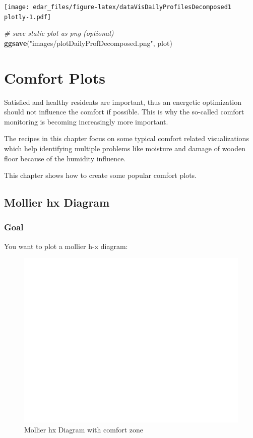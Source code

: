 \documentclass[
  a4paperpaper,
]{book}
\newenvironment{Shaded}{\begin{snugshade}}{\end{snugshade}}
\newcommand{\CommentTok}[1]{\textcolor[rgb]{0.56,0.35,0.01}{\textit{#1}}}
\newcommand{\KeywordTok}[1]{\textcolor[rgb]{0.13,0.29,0.53}{\textbf{#1}}}
\newcommand{\NormalTok}[1]{#1}
\newcommand{\StringTok}[1]{\textcolor[rgb]{0.31,0.60,0.02}{#1}}
\let\oldShaded\Shaded
\let\endoldShaded\endShaded
\renewenvironment{Shaded}{\footnotesize\oldShaded}{\endoldShaded}
\begin{document}
\texttt{[image: edar\_files/figure-latex/dataVisDailyProfilesDecomposed1 plotly-1.pdf]}

\begin{Shaded}
\begin{Highlighting}[]
\CommentTok{# save static plot as png (optional)}
\KeywordTok{ggsave}\NormalTok{(}\StringTok{"images/plotDailyProfDecomposed.png"}\NormalTok{, plot)}
\end{Highlighting}
\end{Shaded}

\hypertarget{comfort-plots}{%
\chapter{Comfort Plots}\label{comfort-plots}}

Satisfied and healthy residents are important, thus an energetic optimization should not influence the comfort if possible. This is why the so-called comfort monitoring is becoming increasingly more important.

The recipes in this chapter focus on some typical comfort related visualizations which help identifying multiple problems like moisture and damage of wooden floor because of the humidity influence.

This chapter shows how to create some popular comfort plots.

\newpage

\hypertarget{mollier-hx-diagram}{%
\section{Mollier hx Diagram}\label{mollier-hx-diagram}}

\hypertarget{goal-12}{%
\subsection{Goal}\label{goal-12}}

You want to plot a mollier h-x diagram:

\begin{figure}
\includegraphics[width=0.7\linewidth]{images/comfortMollierHx} \caption{Mollier hx Diagram with comfort zone}\label{fig:unnamed-chunk-20}
\end{figure}
\end{document}
